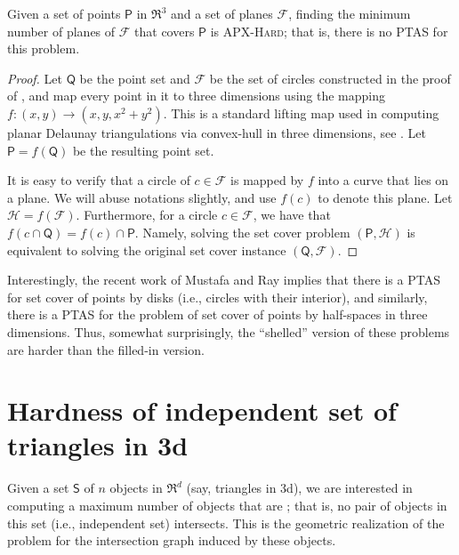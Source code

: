 \documentclass[12pt]{article}
\newcommand{\PntSet}{{\mathsf{Q}}}
\newcommand{\PntSetA}{{\mathsf{P}}}
\newcommand{\ObjSet}{\mathsf{S}}
\providecommand{\ComplexityClass}[1]{{{\textcolor[named]{\si{OliveGreen}}{\textsc{#1}}}}}
\providecommand{\APXHard}{{\ComplexityClass{\si{APX}-Hard}}\xspace}
\providecommand{\PTAS}{\textsf{\si{PTAS}}\xspace}
\newcommand{\Family}{\mathcal{F}}
\newcommand{\FamilyA}{\mathcal{H}}
\begin{document}
\begin{lemma}
    Given a set of points $\PntSetA$ in $\Re^3$ and a set of planes
    $\Family$, finding the minimum number of planes of $\Family$ that
    covers $\PntSetA$ is \APXHard; that is, there is no \PTAS for this
    problem.
\end{lemma}
\begin{proof}
    Let $\PntSet$ be the point set and $\Family$ be the set of circles
    constructed in the proof of , and map
    every point in it to three dimensions using the mapping $f: (x,y)
    \rightarrow (x,y,x^2 + y^2)$.  This is a standard lifting map used
    in computing planar Delaunay triangulations via convex-hull in
    three dimensions, see \cite{bkos-cgaa-00}.  Let $\PntSetA =
    f(\PntSet)$ be the resulting point set.

    It is easy to verify that a circle of $c \in \Family$ is mapped by
    $f$ into a curve that lies on a plane. We will abuse notations
    slightly, and use $f(c)$ to denote this plane.  Let $\FamilyA =
    f(\Family)$. Furthermore, for a circle $c \in \Family$, we have
    that $f(c \cap \PntSet) = f(c) \cap \PntSetA$.  Namely, solving
    the set cover problem $(\PntSetA, \FamilyA)$ is equivalent to
    solving the original set cover instance $(\PntSet, \Family)$.
\end{proof}

\bigskip

Interestingly, the recent work of Mustafa and Ray \cite{mr-irghsp-09}
implies that there is a \PTAS for set cover of points by disks (i.e.,
circles with their interior), and similarly, there is a \PTAS for the
problem of set cover of points by half-spaces in three
dimensions. Thus, somewhat surprisingly, the ``shelled'' version of
these problems are harder than the filled-in version.



\section{Hardness of independent set of triangles in 3d}

Given a set $\ObjSet$ of $n$ objects in $\Re^d$ (say, triangles in
3d), we are interested in computing a maximum number of objects that
are ; that is, no pair of objects in this set
(i.e., independent set) intersects. This is the geometric realization
of the  problem for the intersection graph
induced by these objects.
\end{document}

